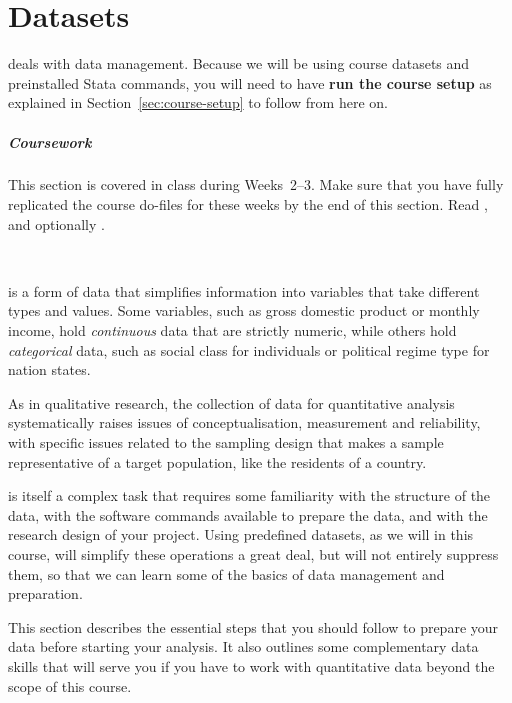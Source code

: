 %
%
\chapter{Datasets}%
	\label{ch:data}%
  \begin{mybox}
     deals with data management. Because we will be using course datasets and preinstalled Stata commands, you will need to have \textbf{run the course setup} as explained in Section~\ref{sec:course-setup} to follow from here on.%
    \paragraph{Coursework} %
    This section is covered in class during Weeks~2--3. Make sure that you have fully replicated the course do-files for these weeks by the end of this section. Read \citeauthor[ch.~2--3]{Urdan:2010a}, and optionally \citeauthor[ch.~2.1--2.4]{FeinsteinThomas:2002d}.%
  \end{mybox}\\[4em]%
  \startcontents[chapters]%
	\newpage


 is a form of data that simplifies information into variables that take different types and values. Some variables, such as gross domestic product or monthly income, hold \emph{continuous} data that are strictly numeric, while others hold \emph{categorical} data, such as social class for individuals or political regime type for nation states.%

As in qualitative research, the collection of data for quantitative analysis systematically raises issues of conceptualisation, measurement and reliability, with specific issues related to the sampling design that makes a sample representative of a target population, like the residents of a country.%

 is itself a complex task that requires some familiarity with the structure of the data, with the software commands available to prepare the data, and with the research design of your project. Using predefined datasets, as we will in this course, will simplify these operations a great deal, but will not entirely suppress them, so that we can learn some of the basics of data management and preparation.%

This section describes the essential steps that you should follow to prepare your data before starting your analysis. It also outlines some complementary data skills that will serve you if you have to work with quantitative data beyond the scope of this course.%

